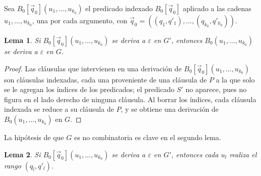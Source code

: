 \documentclass{report}
\theoremstyle{definition}
\theoremstyle{plain}
\newtheorem{lema}{Lema}[chapter]
\begin{document}
Sea $B_0[\vec q_0](u_1, \ldots, u_{k_0})$ el predicado indexado $B_0[\vec q_0]$
aplicado a las cadenas $u_1, \ldots, u_{k_0}$, una por cada argumento, con
$\vec q_0 = ((q_1, q'_1), \ldots, (q_{k_0}, q'_{k_0}))$.

\begin{lema}\label{lema:proyeccion}
Si $B_0[\vec q_0](u_1, \ldots, u_{k_0})$ se deriva a $\varepsilon$ en $G'$,
entonces $B_0(u_1, \ldots, u_{k_0})$ se deriva a $\varepsilon$ en $G$.
\end{lema}

\begin{proof}
Las cláusulas que intervienen en una derivación de
$B_0[\vec q_0](u_1, \ldots, u_{k_0})$ son cláusulas indexadas, cada una
proveniente de una cláusula de $P$ a la que solo se le agregan los
índices de los predicados; el predicado $S'$ no aparece, pues no figura
en el lado derecho de ninguna cláusula. Al borrar los índices, cada cláusula
indexada se reduce a su cláusula de $P$, y se obtiene una derivación de
$B_0(u_1, \ldots, u_{k_0})$ en $G$.
\end{proof}

La hipótesis de que $G$ es no combinatoria es clave en el segundo lema.

\begin{lema}\label{lema:realizacion}
Si $B_0[\vec q_0](u_1, \ldots, u_{k_0})$ se deriva a $\varepsilon$ en $G'$,
entonces cada $u_l$ realiza el rango $(q_l, q'_l)$.
\end{lema}
\end{document}
